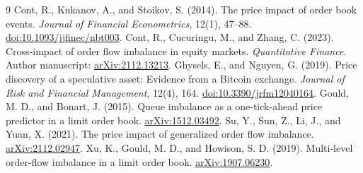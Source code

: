 \documentclass[11pt]{article}
\begin{document}
\clearpage
\begin{thebibliography}{9}
 Cont, R., Kukanov, A., and Stoikov, S. (2014). The price impact of order book events. \emph{Journal of Financial Econometrics}, 12(1), 47--88. \href{https://doi.org/10.1093/jjfinec/nbt003}{doi:10.1093/jjfinec/nbt003}.
 Cont, R., Cucuringu, M., and Zhang, C. (2023). Cross-impact of order flow imbalance in equity markets. \emph{Quantitative Finance}. Author manuscript: \href{https://arxiv.org/abs/2112.13213}{arXiv:2112.13213}.
 Ghysels, E., and Nguyen, G. (2019). Price discovery of a speculative asset: Evidence from a Bitcoin exchange. \emph{Journal of Risk and Financial Management}, 12(4), 164. \href{https://doi.org/10.3390/jrfm12040164}{doi:10.3390/jrfm12040164}.
 Gould, M. D., and Bonart, J. (2015). Queue imbalance as a one-tick-ahead price predictor in a limit order book. \href{https://arxiv.org/abs/1512.03492}{arXiv:1512.03492}.
 Su, Y., Sun, Z., Li, J., and Yuan, X. (2021). The price impact of generalized order flow imbalance. \href{https://arxiv.org/abs/2112.02947}{arXiv:2112.02947}.
 Xu, K., Gould, M. D., and Howison, S. D. (2019). Multi-level order-flow imbalance in a limit order book. \href{https://arxiv.org/abs/1907.06230}{arXiv:1907.06230}.
\end{thebibliography}
\end{document}
